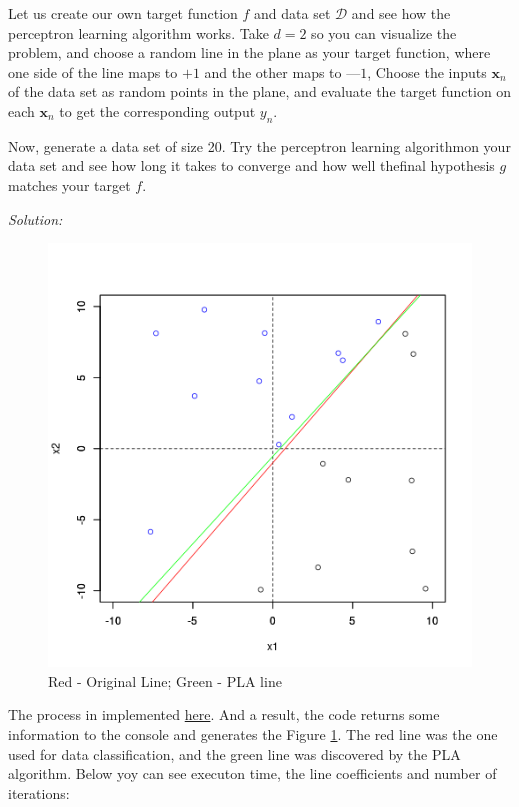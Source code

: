 \documentclass[12pt,letterpaper]{article}
\newcommand{\bx}{\boldsymbol{x}}
\begin{document}
		Let  us  create  our  own  target  function  $f$   and  data  set $\mathcal{D}$  and  see  how  the perceptron  learning  algorithm  works.  Take $d = 2$ so  you  can  visualize  the problem,  and  choose  a  random  line  in  the  plane  as  your  target  function, where one side of the  line  maps to $+1$  and  the other  maps to $—1$,  Choose the  inputs $\bx_n$  of the data  set  as  random  points  in  the  plane,  and  evaluate the target  function  on  each $\bx_n$ to get the corresponding output $y_n$.
		
		 Now, generate a  data  set of size 20.  Try the perceptron  learning algorithmon  your  data  set  and  see  how  long  it  takes  to  converge  and  how  well  thefinal  hypothesis $g$  matches your target  $f$.  
		 
		 \textit{Solution:} 
		 \begin{figure}[!htb]
		 	\centering
		 	\label{pla}
		 	\includegraphics[scale=0.75]{../figs/ex1.4_PLA.png}
		 	\caption{Red - Original Line; Green - PLA line}
		 \end{figure} 
	 
		 The process in implemented \href{https://github.com/reneroliveira/Machine_Learning/blob/main/codes/PLA_algorithm.R}{here}. And a result, the code returns some information to the console and generates the Figure \ref{pla}. The red line was the one used for data classification, and the green line was discovered by the PLA algorithm. Below yoy can see executon time, the line coefficients and number of iterations:
		 
\end{document}
